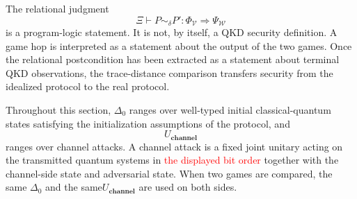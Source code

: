 \documentclass[acmsmall,screen,review,anonymous,nonacm]{acmart}
\theoremstyle{defn_style}
\begin{document}
The relational judgment
\[
\Xi
\vdash
P\sim_{\delta}P'
:
\Phi_{\mathcal V}
\Longrightarrow
\Psi_{\mathcal W}
\]
is a program-logic statement.  It is not, by itself, a QKD security
definition.  A game hop is interpreted as a
statement about the output of the two games.  Once the relational postcondition has been extracted as a statement about
terminal QKD observations, the trace-distance comparison transfers security
from the idealized protocol to the real protocol.

Throughout this section, \(\Delta_0\) ranges over well-typed initial classical-quantum states satisfying the initialization assumptions of the protocol, and
\[
U_{\textbf{channel}}
\]
ranges over  channel attacks.  A channel attack is a fixed joint unitary acting on the transmitted quantum systems in \textcolor{red}{the displayed bit order} together with the channel-side state and adversarial state. When two games are compared, the same \(\Delta_0\) and the same\(U_{\textbf{channel}}\) are used on both sides.
\end{document}
